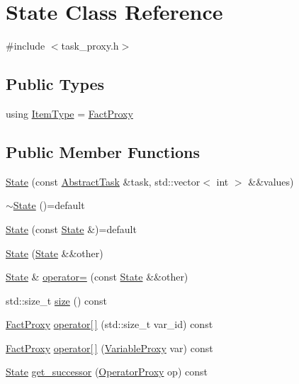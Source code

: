 \hypertarget{classState}{\section{State Class Reference}
\label{classState}
}


{\ttfamily \#include $<$task\-\_\-proxy.\-h$>$}

\subsection*{Public Types}
\begin{DoxyCompactItemize}
\item 
using \hyperlink{classState_a0bc46283299274e3e145886dbc4a2860}{Item\-Type} = \hyperlink{classFactProxy}{Fact\-Proxy}
\end{DoxyCompactItemize}
\subsection*{Public Member Functions}
\begin{DoxyCompactItemize}
\item 
\hyperlink{classState_a190690b30579dad2a05e870ff171ca9f}{State} (const \hyperlink{classAbstractTask}{Abstract\-Task} \&task, std\-::vector$<$ int $>$ \&\&values)
\item 
\hyperlink{classState_a4c9aa4830a9c86e9198eb125287b5ac7}{$\sim$\-State} ()=default
\item 
\hyperlink{classState_ad463f272453461a57c8b9e11f6cad8b6}{State} (const \hyperlink{classState}{State} \&)=default
\item 
\hyperlink{classState_a6c25a4da517d9de8cc0cb211be1d951a}{State} (\hyperlink{classState}{State} \&\&other)
\item 
\hyperlink{classState}{State} \& \hyperlink{classState_ac4c0ea3b3be9f15968f607d033432999}{operator=} (const \hyperlink{classState}{State} \&\&other)
\item 
std\-::size\-\_\-t \hyperlink{classState_aa6a01718876f9abbb5aacbef952ecb21}{size} () const 
\item 
\hyperlink{classFactProxy}{Fact\-Proxy} \hyperlink{classState_a19834bd3879245700be3c31c26ab68a7}{operator\mbox{[}$\,$\mbox{]}} (std\-::size\-\_\-t var\-\_\-id) const 
\item 
\hyperlink{classFactProxy}{Fact\-Proxy} \hyperlink{classState_a3697a9349bb17cb89cfe9110b138b654}{operator\mbox{[}$\,$\mbox{]}} (\hyperlink{classVariableProxy}{Variable\-Proxy} var) const 
\item 
\hyperlink{classState}{State} \hyperlink{classState_a000bbcb5f0d131374acc29c2d5a65c08}{get\-\_\-successor} (\hyperlink{classOperatorProxy}{Operator\-Proxy} op) const 
\end{DoxyCompactItemize}


